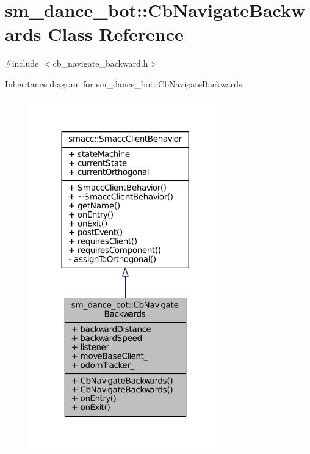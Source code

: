 \hypertarget{classsm__dance__bot_1_1CbNavigateBackwards}{}\section{sm\+\_\+dance\+\_\+bot\+:\+:Cb\+Navigate\+Backwards Class Reference}
\label{classsm__dance__bot_1_1CbNavigateBackwards}


{\ttfamily \#include $<$cb\+\_\+navigate\+\_\+backward.\+h$>$}



Inheritance diagram for sm\+\_\+dance\+\_\+bot\+:\+:Cb\+Navigate\+Backwards\+:
\nopagebreak
\begin{figure}[H]
\begin{center}
\leavevmode
\includegraphics[width=236pt]{classsm__dance__bot_1_1CbNavigateBackwards__inherit__graph}
\end{center}
\end{figure}


